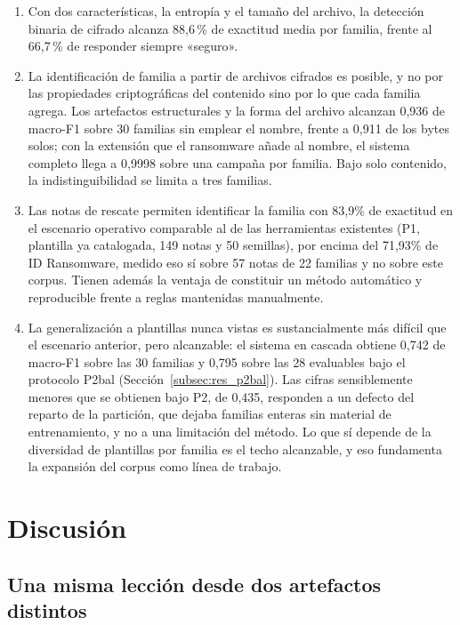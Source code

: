 \begin{enumerate}
    \item Con dos características, la entropía y el tamaño del archivo, la detección binaria de cifrado alcanza 88,6\,\% de exactitud media por familia, frente al 66,7\,\% de responder siempre «seguro».
    \item La identificación de familia a partir de archivos cifrados es posible, y no por las propiedades criptográficas del contenido sino por lo que cada familia agrega. Los artefactos estructurales y la forma del archivo alcanzan 0,936 de macro-F1 sobre 30 familias sin emplear el nombre, frente a 0,911 de los bytes solos; con la extensión que el ransomware añade al nombre, el sistema completo llega a 0,9998 sobre una campaña por familia. Bajo solo contenido, la indistinguibilidad se limita a tres familias.
    \item Las notas de rescate permiten identificar la familia con 83,9\% de exactitud en el escenario operativo comparable al de las herramientas existentes (P1, plantilla ya catalogada, 149 notas y 50 semillas), por encima del 71,93\% de ID Ransomware, medido eso sí sobre 57 notas de 22 familias y no sobre este corpus. Tienen además la ventaja de constituir un método automático y reproducible frente a reglas mantenidas manualmente.
    \item La generalización a plantillas nunca vistas es sustancialmente más difícil que el escenario anterior, pero alcanzable: el sistema en cascada obtiene 0,742 de macro-F1 sobre las 30 familias y 0,795 sobre las 28 evaluables bajo el protocolo P2bal (Sección~\ref{subsec:res_p2bal}). Las cifras sensiblemente menores que se obtienen bajo P2, de 0,435, responden a un defecto del reparto de la partición, que dejaba familias enteras sin material de entrenamiento, y no a una limitación del método. Lo que sí depende de la diversidad de plantillas por familia es el techo alcanzable, y eso fundamenta la expansión del corpus como línea de trabajo.
\end{enumerate}

\section{Discusión}

\subsection{Una misma lección desde dos artefactos distintos}

